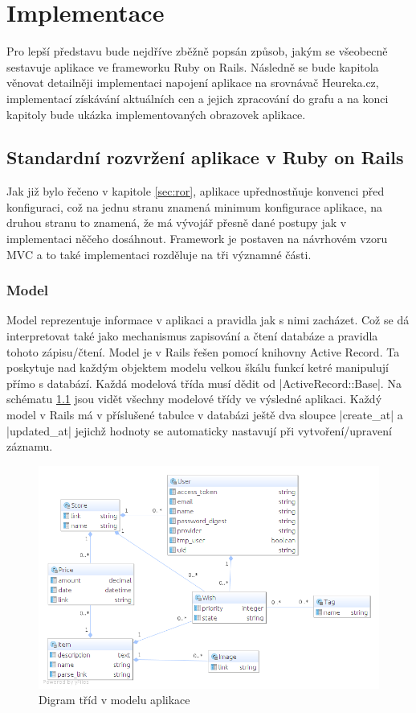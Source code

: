 \chapter{Implementace}
Pro lepší představu bude nejdříve zběžně popsán způsob, jakým se všeobecně sestavuje aplikace ve frameworku Ruby on Rails. Následně se bude kapitola věnovat detailněji implementaci napojení aplikace na srovnávač Heureka.cz, implementací získávání aktuálních cen a jejich zpracování do grafu a na konci kapitoly bude ukázka implementovaných obrazovek aplikace.

\section{Standardní rozvržení aplikace v Ruby on Rails}
Jak již bylo řečeno v kapitole \ref{sec:ror}, aplikace upřednostňuje konvenci před konfiguraci, což na jednu stranu znamená minimum konfigurace aplikace, na druhou stranu to znamená, že má vývojář přesně dané postupy jak v implementaci něčeho dosáhnout. Framework je postaven na návrhovém vzoru MVC a to také implementaci rozděluje na tři významné části.

\subsection{Model}
Model reprezentuje informace v aplikaci a pravidla jak s nimi zacházet. Což se dá interpretovat také jako mechanismus zapisování a čtení databáze a pravidla tohoto zápisu/čtení. Model je v Rails řešen pomocí knihovny Active Record. Ta poskytuje nad každým objektem modelu velkou škálu funkcí ketré manipulují přímo s databází. Každá modelová třída musí dědit od |ActiveRecord::Base|. Na schématu \ref{fig:model-diagram} jsou vidět všechny modelové třídy ve výsledné aplikaci. Každý model v Rails má v příslušené tabulce v databázi ještě dva sloupce |create_at| a |updated_at| jejichž hodnoty se automaticky nastavují při vytvoření/upravení záznamu.

\begin{figure}[htb]
\begin{center}
\includegraphics[width=120mm]{./pictures/model-diagram.png}
\caption{Digram tříd v modelu aplikace}
\label{fig:model-diagram}
\end{center}
\end{figure}

